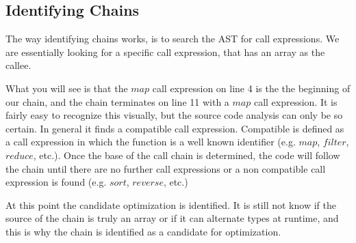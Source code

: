 \subsection{Identifying Chains}

The way identifying chains works, is to search the AST for call expressions.  We are essentially looking for a specific call expression, that has an array as the callee. 

\begin{minipage}{\linewidth}

\end{minipage}

What you will see is that the $map$ call expression on line 4 is the the beginning of our chain, and the chain terminates on line 11 with a $map$ call expression.  It is fairly easy to recognize this visually, but the source code analysis can only be so certain.  In general it finds a compatible call expression.  Compatible is defined as a call expression in which the function is a well known identifier (e.g. $map$, $filter$, $reduce$, etc.). Once the base of the call chain is determined, the code will follow the chain until there are no further call expressions or a non compatible call expression is found (e.g. $sort$, $reverse$, etc.)

At this point the candidate optimization is identified.  It is still not know if the source of the chain is truly an array or if it can alternate types at runtime, and this is why the chain is identified as a candidate for optimization. 

